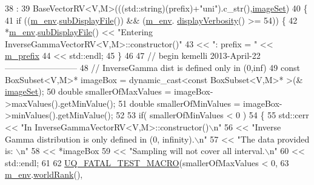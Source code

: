 \begin{DoxyCode}
38   :
39   BaseVectorRV<V,M>(((std::string)(prefix)+\textcolor{stringliteral}{"uni"}).c\_str(),\hyperlink{class_q_u_e_s_o_1_1_base_vector_r_v_aa4dd2f036228eac1f945bacc7147a922}{imageSet})
40 \{
41   \textcolor{keywordflow}{if} ((\hyperlink{class_q_u_e_s_o_1_1_base_vector_r_v_a556761c50e2d171977ef5f19a63c8c73}{m\_env}.\hyperlink{class_q_u_e_s_o_1_1_base_environment_a8a0064746ae8dddfece4229b9ad374d6}{subDisplayFile}()) && (\hyperlink{class_q_u_e_s_o_1_1_base_vector_r_v_a556761c50e2d171977ef5f19a63c8c73}{m\_env}.
      \hyperlink{class_q_u_e_s_o_1_1_base_environment_a1fe5f244fc0316a0ab3e37463f108b96}{displayVerbosity}() >= 54)) \{
42     *\hyperlink{class_q_u_e_s_o_1_1_base_vector_r_v_a556761c50e2d171977ef5f19a63c8c73}{m\_env}.\hyperlink{class_q_u_e_s_o_1_1_base_environment_a8a0064746ae8dddfece4229b9ad374d6}{subDisplayFile}() << \textcolor{stringliteral}{"Entering InverseGammaVectorRV<V,M>::constructor()"}
43                             << \textcolor{stringliteral}{": prefix = "} << \hyperlink{class_q_u_e_s_o_1_1_base_vector_r_v_a030ce3bc9873a9eaf6d8bf452c096ab3}{m\_prefix}
44                             << std::endl;
45   \}
46 
47 \textcolor{comment}{// begin kemelli 2013-April-22 -------------------------- }
48 \textcolor{comment}{// InverseGamma dist is defined only in (0,inf)}
49   \textcolor{keyword}{const} BoxSubset<V,M>* imageBox = \textcolor{keyword}{dynamic\_cast<}\textcolor{keyword}{const }BoxSubset<V,M>* \textcolor{keyword}{>}(&
      \hyperlink{class_q_u_e_s_o_1_1_base_vector_r_v_aa4dd2f036228eac1f945bacc7147a922}{imageSet});
50   \textcolor{keywordtype}{double} smallerOfMaxValues = imageBox->maxValues().getMinValue();      
51   \textcolor{keywordtype}{double} smallerOfMinValues = imageBox->minValues().getMinValue();
52     
53  \textcolor{keywordflow}{if}( smallerOfMinValues < 0 ) 
54  \{              
55    std::cerr << \textcolor{stringliteral}{"In InverseGammaVectorRV<V,M>::constructor()\(\backslash\)n"} 
56        << \textcolor{stringliteral}{"Inverse Gamma distribution is only defined in (0, infinity).\(\backslash\)n"}
57        << \textcolor{stringliteral}{"The data provided is: \(\backslash\)n"}
58        << *imageBox 
59          << \textcolor{stringliteral}{"Sampling will not cover all interval.\(\backslash\)n"}   
60          << std::endl;
61 
62     \hyperlink{_defines_8h_a56d63d18d0a6d45757de47fcc06f574d}{UQ\_FATAL\_TEST\_MACRO}(smallerOfMaxValues < 0,
63                       \hyperlink{class_q_u_e_s_o_1_1_base_vector_r_v_a556761c50e2d171977ef5f19a63c8c73}{m\_env}.\hyperlink{class_q_u_e_s_o_1_1_base_environment_a78b57112bbd0e6dd0e8afec00b40ffa7}{worldRank}(),

\end{DoxyCode}
